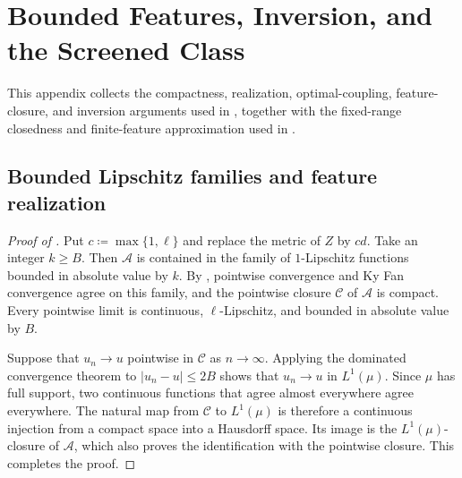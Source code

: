 \documentclass[11pt]{amsart}
\theoremstyle{plain}
\theoremstyle{definition}
\theoremstyle{remark}
\begin{document}
\section{Bounded Features, Inversion, and the Screened Class}
\label{app:bounded-feature-inversion}

This appendix collects the compactness, realization, optimal-coupling, feature-closure, and inversion arguments used in , together with the fixed-range closedness and finite-feature approximation used in .

\subsection{Bounded Lipschitz families and feature realization}
\label{subsec:app-bounded-realization}

\begin{proof}[Proof of ]
Put $c\coloneqq\max\{1,\ell\}$ and replace the metric of $Z$ by $cd$. Take an integer $k\geq B$. Then $\mathcal A$ is contained in the family of $1$-Lipschitz functions bounded in absolute value by $k$. By \cite[Lemma~2.2 and Remark~2.3]{hanika2022gds}, pointwise convergence and Ky Fan convergence agree on this family, and the pointwise closure $\mathcal C$ of $\mathcal A$ is compact. Every pointwise limit is continuous, $\ell$-Lipschitz, and bounded in absolute value by $B$.

Suppose that $u_n\to u$ pointwise in $\mathcal C$ as $n\to\infty$. Applying the dominated convergence theorem \cite[Theorem~3.31, pp.~92--93]{axler2020mira} to $|u_n-u|\leq2B$ shows that $u_n\to u$ in $L^1(\mu)$. Since $\mu$ has full support, two continuous functions that agree almost everywhere agree everywhere. The natural map from $\mathcal C$ to $L^1(\mu)$ is therefore a continuous injection from a compact space into a Hausdorff space. Its image is the $L^1(\mu)$-closure of $\mathcal A$, which also proves the identification with the pointwise closure. This completes the proof.
\end{proof}
\end{document}
